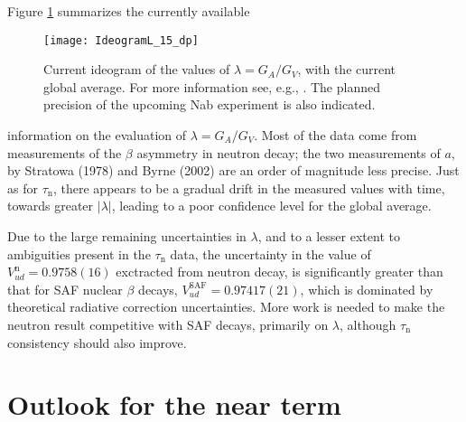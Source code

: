 \documentclass{PoS}
\begin{document}

Figure \ref{fig:ideog_lambda} summarizes the currently available
%
\begin{figure}[b!]
  \centerline{\texttt{[image: IdeogramL\_15\_dp]} }
  \caption{Current ideogram of the values of $\lambda=G_A/G_V$, with the
    current global average.  For more information see, e.g.,
    \cite{Bae14}.  The planned precision of the upcoming Nab experiment
    \cite{Nab,Bae14} is also indicated.}
  \label{fig:ideog_lambda}
\end{figure}
information on the evaluation of $\lambda=G_A/G_V$.  Most of the data
come from measurements of the $\beta$ asymmetry in neutron decay; the
two measurements of $a$, by Stratowa (1978) \cite{Str78} and Byrne
(2002) \cite{Byr02} are an order of magnitude less precise.  Just as for
$\tau_{\text{n}}$, there appears to be a gradual drift in the measured
values with time, towards greater $|\lambda|$, leading to a poor
confidence level for the global average.

Due to the large remaining uncertainties in $\lambda$, and to a lesser
extent to ambiguities present in the $\tau_{\text{n}}$ data, the
uncertainty in the value of $V_{ud}^{\text{n}} = 0.9758(16)$ exctracted
from neutron decay, is significantly greater than that for SAF nuclear
$\beta$ decays, $V_{ud}^{\text{SAF}} = 0.97417(21)$, which is dominated
by theoretical radiative correction uncertainties.  More work is needed
to make the neutron result competitive with SAF decays, primarily on
$\lambda$, although $\tau_{\text{n}}$ consistency should also improve.

\section{Outlook for the near term} 
\end{document}
